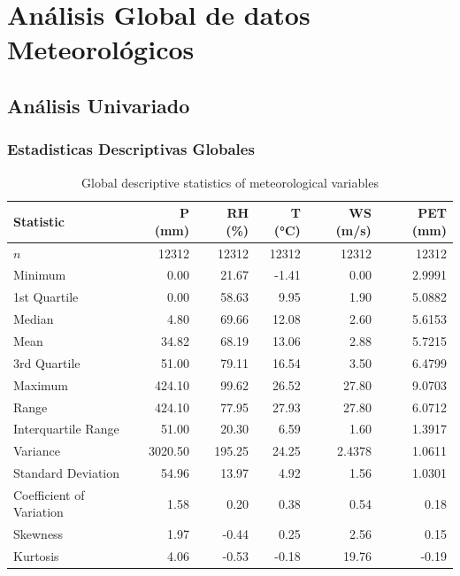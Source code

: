 \chapter{Análisis Global de datos Meteorológicos}
\section{Análisis Univariado}

\subsection{Estadisticas Descriptivas Globales}

\begin{table}[H]
\centering
\caption{Global descriptive statistics of meteorological variables}
\label{tab:global_statistics}
\small
\begin{tabular}{lrrrrr}
\toprule
\textbf{Statistic} & \textbf{P (mm)} & \textbf{RH (\%)} & \textbf{T (°C)} & \textbf{WS (m/s)} & \textbf{PET (mm)} \\
\midrule
$n$                         & 12312 & 12312 & 12312 & 12312 & 12312 \\
Minimum                    & 0.00   & 21.67  & -1.41  & 0.00   & 2.9991 \\
1st Quartile               & 0.00   & 58.63  & 9.95   & 1.90   & 5.0882 \\
Median                     & 4.80   & 69.66  & 12.08  & 2.60   & 5.6153 \\
Mean                       & 34.82  & 68.19  & 13.06  & 2.88   & 5.7215 \\
3rd Quartile               & 51.00  & 79.11  & 16.54  & 3.50   & 6.4799 \\
Maximum                    & 424.10 & 99.62  & 26.52  & 27.80  & 9.0703 \\
Range                      & 424.10 & 77.95  & 27.93  & 27.80  & 6.0712 \\
Interquartile Range        & 51.00  & 20.30  & 6.59   & 1.60   & 1.3917 \\
Variance                   & 3020.50 & 195.25 & 24.25  & 2.4378 & 1.0611 \\
Standard Deviation         & 54.96  & 13.97  & 4.92   & 1.56   & 1.0301 \\
Coefficient of Variation   & 1.58   & 0.20   & 0.38   & 0.54   & 0.18 \\
Skewness                 & 1.97   & -0.44  & 0.25   & 2.56   & 0.15 \\
Kurtosis                   & 4.06   & -0.53  & -0.18  & 19.76  & -0.19 \\
\bottomrule
\end{tabular}
\end{table}


